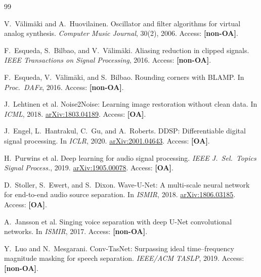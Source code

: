 \documentclass[10pt,twocolumn,letterpaper]{article}
\begin{document}
\FloatBarrier
\clearpage
\raggedbottom
\balance
{\footnotesize
\setlength{\baselineskip}{11.5pt}
\begin{thebibliography}{99}
\setlength{\itemsep}{0.25ex plus 0.05ex}
\setlength{\parsep}{0pt}
\setlength{\parskip}{0pt}

V.~V\"alim\"aki and A.~Huovilainen.
\newblock Oscillator and filter algorithms for virtual analog synthesis.
\newblock \emph{Computer Music Journal}, 30(2), 2006.
\newblock Access: \textbf{[non-OA]}.

F.~Esqueda, S.~Bilbao, and V.~V\"alim\"aki.
\newblock Aliasing reduction in clipped signals.
\newblock \emph{IEEE Transactions on Signal Processing}, 2016.
\newblock Access: \textbf{[non-OA]}.

F.~Esqueda, V.~V\"alim\"aki, and S.~Bilbao.
\newblock Rounding corners with BLAMP.
\newblock In \emph{Proc.\ DAFx}, 2016.
\newblock Access: \textbf{[non-OA]}.

J.~Lehtinen et al.
\newblock Noise2Noise: Learning image restoration without clean data.
\newblock In \emph{ICML}, 2018.
\newblock \href{https://arxiv.org/abs/1803.04189}{arXiv:1803.04189}.
\newblock Access: \textbf{[OA]}.

J.~Engel, L.~Hantrakul, C.~Gu, and A.~Roberts.
\newblock DDSP: Differentiable digital signal processing.
\newblock In \emph{ICLR}, 2020.
\newblock \href{https://arxiv.org/abs/2001.04643}{arXiv:2001.04643}.
\newblock Access: \textbf{[OA]}.

H.~Purwins et al.
\newblock Deep learning for audio signal processing.
\newblock \emph{IEEE J.\ Sel.\ Topics Signal Process.}, 2019.
\newblock \href{https://arxiv.org/abs/1905.00078}{arXiv:1905.00078}.
\newblock Access: \textbf{[OA]}.

D.~Stoller, S.~Ewert, and S.~Dixon.
\newblock Wave-U-Net: A multi-scale neural network for end-to-end audio source separation.
\newblock In \emph{ISMIR}, 2018.
\newblock \href{https://arxiv.org/abs/1806.03185}{arXiv:1806.03185}.
\newblock Access: \textbf{[OA]}.

A.~Jansson et al.
\newblock Singing voice separation with deep U-Net convolutional networks.
\newblock In \emph{ISMIR}, 2017.
\newblock Access: \textbf{[non-OA]}.

Y.~Luo and N.~Mesgarani.
\newblock Conv-TasNet: Surpassing ideal time--frequency magnitude masking for speech separation.
\newblock \emph{IEEE/ACM TASLP}, 2019.
\newblock Access: \textbf{[non-OA]}.


\end{thebibliography}}
\end{document}
